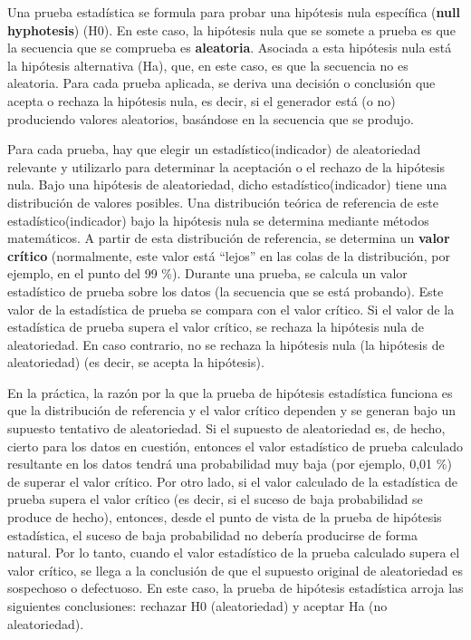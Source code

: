 	Una prueba estadística se formula para probar una hipótesis nula específica (\textbf{null hyphotesis}) (H0). En este caso, la hipótesis nula que se somete a prueba es que la secuencia que se comprueba es \textbf{aleatoria}. Asociada a esta hipótesis nula está la hipótesis alternativa (Ha), que, en este caso, es que la secuencia no es aleatoria. Para cada prueba aplicada, se deriva una decisión o conclusión que acepta o rechaza la hipótesis nula, es decir, si el generador está (o no) produciendo valores aleatorios, basándose en la secuencia que se produjo.
	
	Para cada prueba, hay que elegir un estadístico(indicador) de aleatoriedad relevante y utilizarlo para determinar la aceptación o el rechazo de la hipótesis nula. Bajo una hipótesis de aleatoriedad, dicho estadístico(indicador) tiene una distribución de valores posibles. Una distribución teórica de referencia de este estadístico(indicador) bajo la hipótesis nula se determina mediante métodos matemáticos. A partir de esta distribución de referencia, se determina un \textbf{valor crítico} (normalmente, este valor está ``lejos'' en las colas de la distribución, por ejemplo, en el punto del 99 \%). Durante una prueba, se calcula un valor estadístico de prueba sobre los datos (la secuencia que se está probando). Este valor de la estadística de prueba se compara con el valor crítico. Si el valor de la estadística de prueba supera el valor crítico, se rechaza la hipótesis nula de aleatoriedad. En caso contrario, no se rechaza la hipótesis nula (la hipótesis de aleatoriedad) (es decir, se acepta la hipótesis).
	
	En la práctica, la razón por la que la prueba de hipótesis estadística funciona es que la distribución de referencia y el valor crítico dependen y se generan bajo un supuesto tentativo de aleatoriedad. Si el supuesto de aleatoriedad es, de hecho, cierto para los datos en cuestión, entonces el valor estadístico de prueba calculado resultante en los datos tendrá una probabilidad muy baja (por ejemplo, 0,01 \%) de superar el valor crítico. Por otro lado, si el valor calculado de la estadística de prueba supera el valor crítico (es decir, si el suceso de baja probabilidad se produce de hecho), entonces, desde el punto de vista de la prueba de hipótesis estadística, el suceso de baja probabilidad no debería producirse de forma natural. Por lo tanto, cuando el valor estadístico de la prueba calculado supera el valor crítico, se llega a la conclusión de que el supuesto original de aleatoriedad es sospechoso o defectuoso. En este caso, la prueba de hipótesis estadística arroja las siguientes conclusiones: rechazar H0 (aleatoriedad) y aceptar Ha (no aleatoriedad).
	
